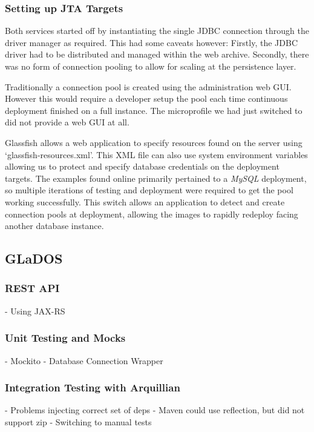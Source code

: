         \subsubsection{Setting up JTA Targets}
        Both services started off by instantiating the single JDBC connection through the driver manager as required. This had some caveats however: Firstly, the JDBC driver had to be distributed and managed within the web archive. Secondly, there was no form of connection pooling to allow for scaling at the persistence layer.

        \par
        Traditionally a connection pool is created using the administration web GUI. However this would require a developer setup the pool each time continuous deployment finished on a full instance. The microprofile we had just switched to did not provide a web GUI at all.

        \par
        Glassfish allows a web application to specify resources found on the server using `glassfish-resources.xml'. This XML file can also use system environment variables allowing us to protect and specify database credentials on the deployment targets. The examples found online primarily pertained to a \textit{MySQL} deployment, so multiple iterations of testing and deployment were required to get the pool working successfully. This switch allows an application to detect and create connection pools at deployment, allowing the images to rapidly redeploy facing another database instance.

    \subsection{GLaDOS}
        \subsubsection{REST API}
        - Using JAX-RS

        \subsubsection{Unit Testing and Mocks}
        - Mockito
        - Database Connection Wrapper

        \subsubsection{Integration Testing with Arquillian}
        - Problems injecting correct set of deps
        - Maven could use reflection, but did not support zip
        - Switching to manual tests

